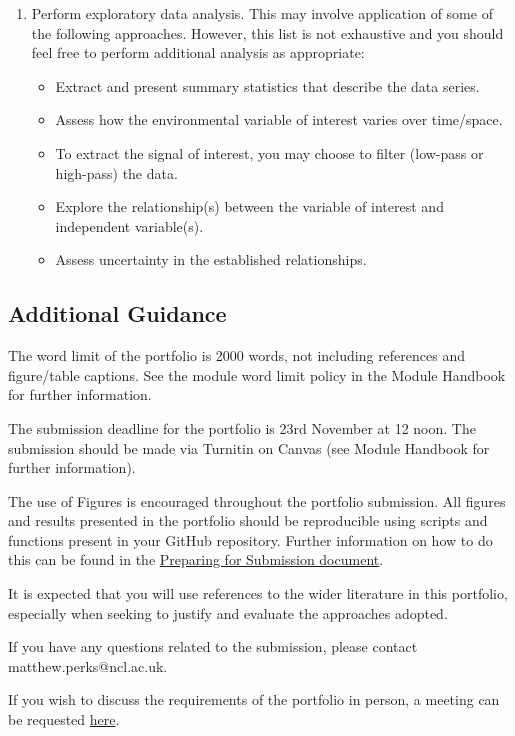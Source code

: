 \documentclass[11pt,onecolumn,a4paper,notitlepage]{article}
\begin{document}
\begin{enumerate}[resume]
\item{Perform exploratory data analysis. This may involve application of some of the following approaches. However, this list is not exhaustive and you should feel free to perform additional analysis as appropriate:} 

\begin{itemize}
\item{Extract and present summary statistics that describe the data series.}
\item{Assess how the environmental variable of interest varies over time/space.}
\item{To extract the signal of interest, you may choose to filter (low-pass or high-pass) the data.}
\item{Explore the relationship(s) between the variable of interest and independent variable(s).}
\item{Assess uncertainty in the established relationships.}
\end{itemize}

\end{enumerate}


\subsection*{Additional Guidance}

\noindent The word limit of the portfolio is 2000 words, not including references and figure/table captions. See the module word limit policy in the Module Handbook for further information.
\bigskip

\noindent 
The submission deadline for the portfolio is 23rd November at 12 noon. The submission should be made via Turnitin on Canvas (see Module Handbook for further information).
\bigskip

\noindent 
The use of Figures is encouraged throughout the portfolio submission. All figures and results presented in the portfolio should be reproducible using scripts and functions present in your GitHub repository. Further information on how to do this can be found in the \href{}{Preparing for Submission document}.
\bigskip

\noindent 
It is expected that you will use references to the wider literature in this portfolio, especially when seeking to justify and evaluate the approaches adopted.
\bigskip

\noindent If you have any questions related to the submission, please contact matthew.perks@ncl.ac.uk.

\bigskip

\noindent 
If you wish to discuss the requirements of the portfolio in person, a meeting can be requested \href{https://bit.ly/36YS3oW}{here}.
\end{document}
